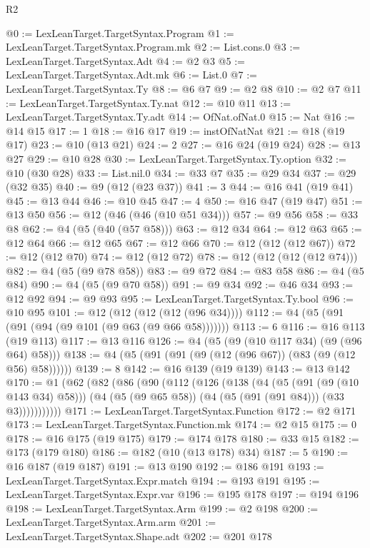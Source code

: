 \begin{lexlean}{R2}
\begin{coremodule}
@0 := LexLeanTarget.TargetSyntax.Program
@1 := LexLeanTarget.TargetSyntax.Program.mk
@2 := List.cons.{0}
@3 := LexLeanTarget.TargetSyntax.Adt
@4 := @2 @3
@5 := LexLeanTarget.TargetSyntax.Adt.mk
@6 := List.{0}
@7 := LexLeanTarget.TargetSyntax.Ty
@8 := @6 @7
@9 := @2 @8
@10 := @2 @7
@11 := LexLeanTarget.TargetSyntax.Ty.nat
@12 := @10 @11
@13 := LexLeanTarget.TargetSyntax.Ty.adt
@14 := OfNat.ofNat.{0}
@15 := Nat
@16 := @14 @15
@17 := 1
@18 := @16 @17
@19 := instOfNatNat
@21 := @18 (@19 @17)
@23 := @10 (@13 @21)
@24 := 2
@27 := @16 @24 (@19 @24)
@28 := @13 @27
@29 := @10 @28
@30 := LexLeanTarget.TargetSyntax.Ty.option
@32 := @10 (@30 @28)
@33 := List.nil.{0}
@34 := @33 @7
@35 := @29 @34
@37 := @29 (@32 @35)
@40 := @9 (@12 (@23 @37))
@41 := 3
@44 := @16 @41 (@19 @41)
@45 := @13 @44
@46 := @10 @45
@47 := 4
@50 := @16 @47 (@19 @47)
@51 := @13 @50
@56 := @12 (@46 (@46 (@10 @51 @34)))
@57 := @9 @56
@58 := @33 @8
@62 := @4 (@5 (@40 (@57 @58)))
@63 := @12 @34
@64 := @12 @63
@65 := @12 @64
@66 := @12 @65
@67 := @12 @66
@70 := @12 (@12 (@12 @67))
@72 := @12 (@12 @70)
@74 := @12 (@12 @72)
@78 := @12 (@12 (@12 (@12 @74)))
@82 := @4 (@5 (@9 @78 @58))
@83 := @9 @72
@84 := @83 @58
@86 := @4 (@5 @84)
@90 := @4 (@5 (@9 @70 @58))
@91 := @9 @34
@92 := @46 @34
@93 := @12 @92
@94 := @9 @93
@95 := LexLeanTarget.TargetSyntax.Ty.bool
@96 := @10 @95
@101 := @12 (@12 (@12 (@12 (@96 @34))))
@112 := @4 (@5 (@91 (@91 (@94 (@9 @101 (@9 @63 (@9 @66 @58)))))))
@113 := 6
@116 := @16 @113 (@19 @113)
@117 := @13 @116
@126 := @4 (@5 (@9 (@10 @117 @34) (@9 (@96 @64) @58)))
@138 := @4 (@5 (@91 (@91 (@9 (@12 (@96 @67)) (@83 (@9 (@12 @56) @58))))))
@139 := 8
@142 := @16 @139 (@19 @139)
@143 := @13 @142
@170 := @1
    (@62
      (@82
        (@86
          (@90
            (@112
              (@126
                (@138
                  (@4
                    (@5 (@91 (@9 (@10 @143 @34) @58)))
                    (@4 (@5 (@9 @65 @58)) (@4 (@5 (@91 (@91 @84))) (@33 @3)))))))))))
@171 := LexLeanTarget.TargetSyntax.Function
@172 := @2 @171
@173 := LexLeanTarget.TargetSyntax.Function.mk
@174 := @2 @15
@175 := 0
@178 := @16 @175 (@19 @175)
@179 := @174 @178
@180 := @33 @15
@182 := @173 (@179 @180)
@186 := @182 (@10 (@13 @178) @34)
@187 := 5
@190 := @16 @187 (@19 @187)
@191 := @13 @190
@192 := @186 @191
@193 := LexLeanTarget.TargetSyntax.Expr.match
@194 := @193 @191
@195 := LexLeanTarget.TargetSyntax.Expr.var
@196 := @195 @178
@197 := @194 @196
@198 := LexLeanTarget.TargetSyntax.Arm
@199 := @2 @198
@200 := LexLeanTarget.TargetSyntax.Arm.arm
@201 := LexLeanTarget.TargetSyntax.Shape.adt
@202 := @201 @178

\end{coremodule}
\end{lexlean}
